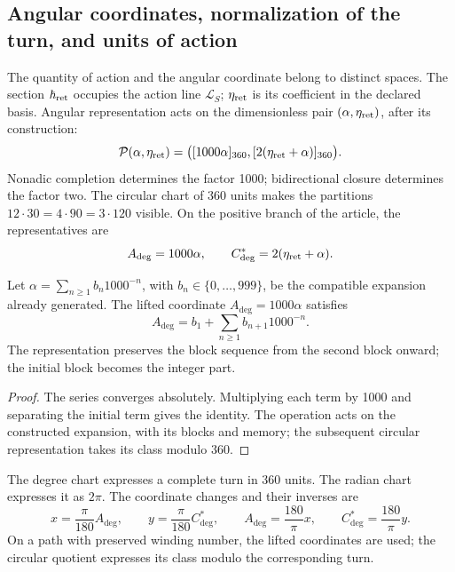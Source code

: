 \subsection{Angular coordinates, normalization of the turn, and units of action}
\label{sec:ii-angulos}

The quantity of action and the angular coordinate belong to distinct
spaces. The section \(\hbar_{\rm ret}\) occupies the action line
\(\mathcal L_S\); \(\eta_{\rm ret}\) is its coefficient in the
declared basis. Angular representation acts on the dimensionless pair
\((\alpha,\eta_{\rm ret})\), after its construction:
\begin{equation}
 \mathcal P(\alpha,\eta_{\rm ret})
 =\bigl([1000\alpha]_{360},[2(\eta_{\rm ret}+\alpha)]_{360}\bigr).
 \label{eq:ii-par-angular}
\end{equation}
Nonadic completion determines the factor 1000; bidirectional
closure determines the factor two. The circular chart of 360
units makes the partitions
\(12\cdot30=4\cdot90=3\cdot120\) visible. On the positive branch of
the article, the representatives are
\[
 A_{\deg}=1000\alpha,\qquad
 C^*_{\deg}=2(\eta_{\rm ret}+\alpha).
\]

\begin{proposition}
\label{prop:ii-desplazamiento-angular}
Let \(\alpha=\sum_{n\geq1}b_n1000^{-n}\), with
\(b_n\in\{0,\ldots,999\}\), be the compatible expansion already generated.
The lifted coordinate \(A_{\deg}=1000\alpha\) satisfies
\[
 A_{\deg}=b_1+\sum_{n\geq1}b_{n+1}1000^{-n}.
\]
The representation preserves the block sequence from the second block onward;
the initial block becomes the integer part.
\end{proposition}
\begin{proof}
The series converges absolutely. Multiplying each term by 1000
and separating the initial term gives the identity. The operation
acts on the constructed expansion, with its blocks and memory;
the subsequent circular representation takes its class modulo 360.
\end{proof}

\begin{definition}
The degree chart expresses a complete turn in 360 units.
The radian chart expresses it as \(2\pi\). The coordinate changes
and their inverses are
\[
 x=\frac{\pi}{180}A_{\deg},\qquad
 y=\frac{\pi}{180}C^*_{\deg},\qquad
 A_{\deg}=\frac{180}{\pi}x,\qquad
 C^*_{\deg}=\frac{180}{\pi}y.
\]
On a path with preserved winding number, the lifted coordinates
are used; the circular quotient expresses its class modulo
the corresponding turn.
\end{definition}

